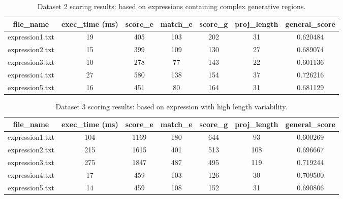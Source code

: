 \documentclass[12pt,a4paper]{article}
\begin{document}
\begin{table}[H]
	\begin{center}
		\caption{Dataset 2 scoring results: based on expressions containing complex generative regions.}
		\label{tab:dataset2}
		\begin{tabular}{|c|c|c|c|c|c|c|}
			\hline
			\textbf{file\_name} & \textbf{exec\_time} (ms) & \textbf{score\_e} & \textbf{match\_e} & \textbf{score\_g} & \textbf{proj\_length} & \textbf{general\_score} \\
			\hline\hline
			expression1.txt & 19 & 405 & 103 & 202 & 31 & 0.620484 \\
			\hline
			expression2.txt & 15 & 399 & 109 & 130 & 27 & 0.689074 \\
			\hline
			expression3.txt & 10 & 278 & 77  & 143 & 22 & 0.601136 \\
			\hline
			expression4.txt & 27 & 580 & 138 & 154 & 37 & 0.726216 \\
			\hline
			expression5.txt & 16 & 451 & 80  & 164 & 31 & 0.681129 \\
			\hline
		\end{tabular}
	\end{center}
\end{table}

\begin{table}[H]
	\begin{center}
		\caption{Dataset 3 scoring results: based on expression with high length variability.}
		\label{tab:dataset3}
		\begin{tabular}{|c|c|c|c|c|c|c|}
			\hline
			\textbf{file\_name} & \textbf{exec\_time} (ms) & \textbf{score\_e} & \textbf{match\_e} & \textbf{score\_g} & \textbf{proj\_length} & \textbf{general\_score} \\
			\hline\hline
			expression1.txt & 104 & 1169 & 180 & 644 & 93  & 0.600269 \\
			\hline
			expression2.txt & 215 & 1615 & 401 & 513 & 108 & 0.696667 \\
			\hline
			expression3.txt & 275 & 1847 & 487 & 495 & 119 & 0.719244 \\
			\hline
			expression4.txt & 17  & 459  & 103 & 126 & 30  & 0.709500 \\
			\hline
			expression5.txt & 14  & 459  & 108 & 152 & 31  & 0.690806 \\
			\hline
		\end{tabular}
	\end{center}
\end{table}
\end{document}
